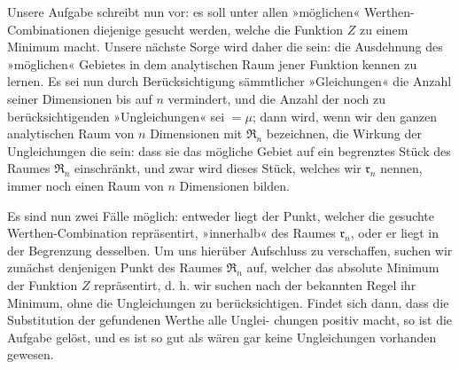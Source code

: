 \indent Unsere Aufgabe schreibt nun vor: es soll unter allen »möglichen« Werthen-Combi\-nationen diejenige gesucht werden, welche die Funktion \(Z\) zu einem Minimum macht. Unsere nächste Sorge wird daher die sein: die Ausdehnung des »möglichen« Gebietes in dem analytischen Raum jener Funktion kennen zu lernen. Es sei nun durch Berücksichtigung sämmtlicher »Gleichungen« die Anzahl seiner Dimensionen bis auf \(n\) vermindert, und die Anzahl der noch zu berücksichtigenden »Ungleichungen« sei \(=\mu\); dann wird, wenn wir den ganzen analytischen Raum von \(n\) Dimensionen mit \(\mathfrak{R}_n\) bezeichnen, die Wirkung der Ungleichungen die sein: dass sie das mögliche Gebiet auf ein begrenztes Stück des Raumes \(\mathfrak{R}_n\) einschränkt, und zwar wird dieses Stück, welches wir \(\mathfrak{r}_n\) nennen, immer noch einen Raum von \(n\) Dimensionen bilden.

\indent Es sind nun zwei Fälle möglich: entweder liegt der Punkt, welcher die gesuchte Werthen-Combination repräsentirt, »innerhalb« des Raumes \(\mathfrak{r}_n\), oder er liegt in der Begrenzung desselben. Um uns hierüber Aufschluss zu verschaffen, suchen wir zunächst denjenigen Punkt des Raumes \(\mathfrak{R}_n\) auf, welcher das absolute Minimum der Funktion \(Z\) repräsentirt, d. h. wir suchen nach der bekannten Regel ihr Minimum, ohne die Ungleichungen zu berücksichtigen. Findet sich dann, dass die Substitution der gefundenen Werthe alle Unglei-
\clearpage{}
\noindent chungen positiv macht, so ist die Aufgabe gelöst, und es ist so gut als wären gar keine Ungleichungen vorhanden gewesen.

